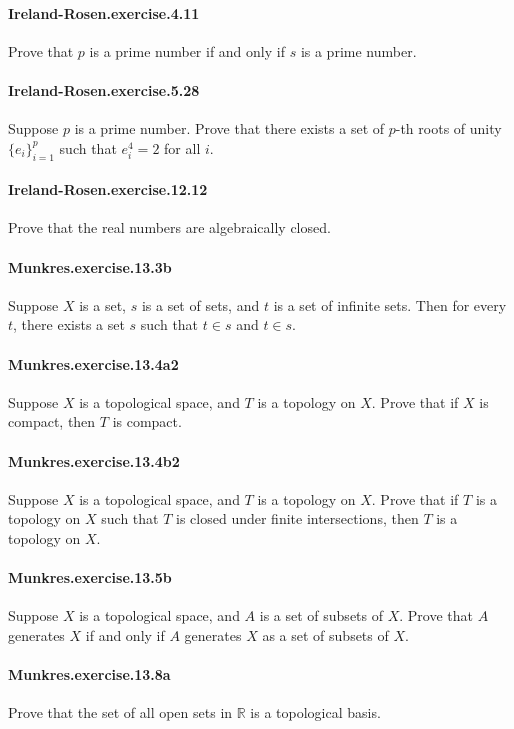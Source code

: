 \documentclass{article}
\begin{document}
\paragraph{Ireland-Rosen.exercise.4.11} Prove that $p$ is a prime number if and only if $s$ is a prime number.

\paragraph{Ireland-Rosen.exercise.5.28} Suppose $p$ is a prime number. Prove that there exists a set of $p$-th roots of unity $\{e_i\}_{i=1}^p$ such that $e_i^4 = 2$ for all $i$.

\paragraph{Ireland-Rosen.exercise.12.12} Prove that the real numbers are algebraically closed.

\paragraph{Munkres.exercise.13.3b} Suppose $X$ is a set, $s$ is a set of sets, and $t$ is a set of infinite sets. Then for every $t$, there exists a set $s$ such that $t ∈ s$ and $t ∈ s$.

\paragraph{Munkres.exercise.13.4a2} Suppose $X$ is a topological space, and $T$ is a topology on $X$. Prove that if $X$ is compact, then $T$ is compact.

\paragraph{Munkres.exercise.13.4b2} Suppose $X$ is a topological space, and $T$ is a topology on $X$. Prove that if $T$ is a topology on $X$ such that $T$ is closed under finite intersections, then $T$ is a topology on $X$.

\paragraph{Munkres.exercise.13.5b} Suppose $X$ is a topological space, and $A$ is a set of subsets of $X$. Prove that $A$ generates $X$ if and only if $A$ generates $X$ as a set of subsets of $X$.

\paragraph{Munkres.exercise.13.8a} Prove that the set of all open sets in $\mathbb{R}$ is a topological basis.
\end{document}
